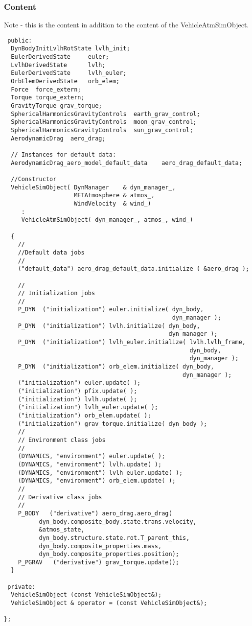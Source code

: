 \documentclass[twoside,11pt,titlepage]{report}
\begin{document}
\subsubsection{Content}
Note - this is the content in addition to the content of the
VehicleAtmSimObject.
\begin{verbatim}
 public:
  DynBodyInitLvlhRotState lvlh_init;
  EulerDerivedState     euler;
  LvlhDerivedState      lvlh;
  EulerDerivedState     lvlh_euler;
  OrbElemDerivedState   orb_elem;
  Force  force_extern;
  Torque torque_extern;
  GravityTorque grav_torque;
  SphericalHarmonicsGravityControls  earth_grav_control;
  SphericalHarmonicsGravityControls  moon_grav_control;
  SphericalHarmonicsGravityControls  sun_grav_control;
  AerodynamicDrag  aero_drag;

  // Instances for default data:
  AerodynamicDrag_aero_model_default_data    aero_drag_default_data;

  //Constructor
  VehicleSimObject( DynManager    & dyn_manager_,
                    METAtmosphere & atmos_,
                    WindVelocity  & wind_)
     :
     VehicleAtmSimObject( dyn_manager_, atmos_, wind_)

  {
    //
    //Default data jobs
    //
    ("default_data") aero_drag_default_data.initialize ( &aero_drag );

    //
    // Initialization jobs
    //
    P_DYN  ("initialization") euler.initialize( dyn_body,
                                                dyn_manager );
    P_DYN  ("initialization") lvlh.initialize( dyn_body,
                                               dyn_manager );
    P_DYN  ("initialization") lvlh_euler.initialize( lvlh.lvlh_frame,
                                                     dyn_body,
                                                     dyn_manager );
    P_DYN  ("initialization") orb_elem.initialize( dyn_body,
                                                   dyn_manager );
    ("initialization") euler.update( );
    ("initialization") pfix.update( );
    ("initialization") lvlh.update( );
    ("initialization") lvlh_euler.update( );
    ("initialization") orb_elem.update( );
    ("initialization") grav_torque.initialize( dyn_body );
    //
    // Environment class jobs
    //
    (DYNAMICS, "environment") euler.update( );
    (DYNAMICS, "environment") lvlh.update( );
    (DYNAMICS, "environment") lvlh_euler.update( );
    (DYNAMICS, "environment") orb_elem.update( );
    //
    // Derivative class jobs
    //
    P_BODY   ("derivative") aero_drag.aero_drag(
          dyn_body.composite_body.state.trans.velocity,
          &atmos_state,
          dyn_body.structure.state.rot.T_parent_this,
          dyn_body.composite_properties.mass,
          dyn_body.composite_properties.position);
    P_PGRAV   ("derivative") grav_torque.update();
  }

 private:
  VehicleSimObject (const VehicleSimObject&);
  VehicleSimObject & operator = (const VehicleSimObject&);

};
\end{verbatim}
\end{document}
